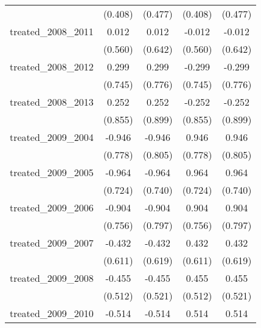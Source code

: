 {\begin{tabular}{l*{4}{c}}
            &     (0.408)         &     (0.477)         &     (0.408)         &     (0.477)         \\
[1em]
treated\_2008\_2011&       0.012         &       0.012         &      -0.012         &      -0.012         \\
            &     (0.560)         &     (0.642)         &     (0.560)         &     (0.642)         \\
[1em]
treated\_2008\_2012&       0.299         &       0.299         &      -0.299         &      -0.299         \\
            &     (0.745)         &     (0.776)         &     (0.745)         &     (0.776)         \\
[1em]
treated\_2008\_2013&       0.252         &       0.252         &      -0.252         &      -0.252         \\
            &     (0.855)         &     (0.899)         &     (0.855)         &     (0.899)         \\
[1em]
treated\_2009\_2004&      -0.946         &      -0.946         &       0.946         &       0.946         \\
            &     (0.778)         &     (0.805)         &     (0.778)         &     (0.805)         \\
[1em]
treated\_2009\_2005&      -0.964         &      -0.964         &       0.964         &       0.964         \\
            &     (0.724)         &     (0.740)         &     (0.724)         &     (0.740)         \\
[1em]
treated\_2009\_2006&      -0.904         &      -0.904         &       0.904         &       0.904         \\
            &     (0.756)         &     (0.797)         &     (0.756)         &     (0.797)         \\
[1em]
treated\_2009\_2007&      -0.432         &      -0.432         &       0.432         &       0.432         \\
            &     (0.611)         &     (0.619)         &     (0.611)         &     (0.619)         \\
[1em]
treated\_2009\_2008&      -0.455         &      -0.455         &       0.455         &       0.455         \\
            &     (0.512)         &     (0.521)         &     (0.512)         &     (0.521)         \\
[1em]
treated\_2009\_2010&      -0.514         &      -0.514         &       0.514         &       0.514         \\

\end{tabular}}
